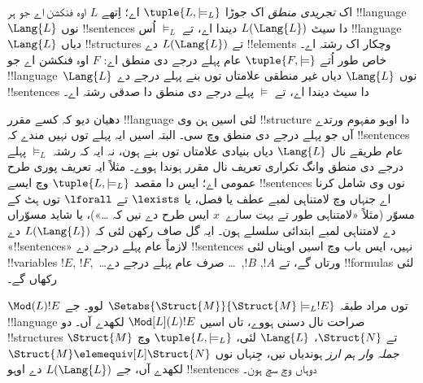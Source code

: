 \documentclass[../../../include/open-logic-section]{subfiles}
\begin{document}

\begin{defn}
اک \emph{تجریدی منطق} اک جوڑا $\tuple{L, \models_L}$ اے؛ اِتھے $L$
اوہ فنکشن اے جو ہر !!{language}~$\Lang{L}$ نوں
!!{sentence}s دا سیٹ $L(\Lang{L})$ دیندا اے، تے $\models_L$
اُس !!{language}~$\Lang{L}$ دیاں !!{structure}s تے
$L(\Lang{L})$ دے !!{element}s وچکار اک رشتہ اے۔ خاص طور اُتے
$\tuple{F, \models}$ عام پہلے درجے دی منطق اے: $F$ اوہ فنکشن اے
جو !!{language}~$\Lang{L}$ نوں $\Lang{L}$ دیاں غیر منطقی علامتاں توں بنے
پہلے درجے دے !!{sentence}s دا سیٹ دیندا اے، تے $\models$
پہلے درجے دی منطق دا صدقی رشتہ اے۔
\end{defn}

دھیان دیو کہ کسے مقرر !!{language} لئی اسیں ہن وی
!!{structure} دا اوہو مفہوم ورتدے آں جو پہلے درجے دی منطق وچ
سی۔ البتہ اسیں ایہ پہلے توں نہیں مندے کہ !!{sentence}s عام
طریقے نال $\Lang{L}$ دیاں بنیادی علامتاں توں بنے ہون، نہ ایہ
کہ رشتہ $\models_L$ پہلے درجے دی منطق وانگ تکراری تعریف نال
مقرر ہوندا ہووے۔ مثلاً ایہ تعریف پوری طرح عمومی اے؛ ایس دا
مقصد $\tuple{L,\models_L}$ وچ ایسے !!{sentence}s نوں وی شامل
کرنا اے جنہاں وچ لامتناہی لمبے
عطف یا فصل، یا $\lexists$ تے $\lforall$ توں ہٹ کے مسوّر
(مثلاً «لامتناہی طور تے بہت سارے~$x$ ایس طرح دے نیں کہ \dots»)،
یا شاید مسوّراں دے لامتناہی لمبے ابتدائی سلسلے ہون۔ ایہ گل
صاف رکھن لئی کہ $L(\Lang{L})$ دے «!!{sentence}s» لازماً عام
پہلے درجے دے !!{sentence}s نہیں، ایس باب وچ اسیں اوہناں لئی
!!{variable}s $!E$, $!F$,~\dots ورتاں گے، تے $!A$, $!B$,~\dots
صرف عام پہلے درجے دے !!{formula}s لئی رکھاں گے۔

\begin{defn}
$\Mod(L){!E}$ توں مراد طبقہ $\Setabs{\Struct{M}}{\Struct{M}
  \models_L !E}$ لوو۔ جے !!{language} صراحت نال دسنی ہووے،
تاں اسیں $\Mod[L](L){!E}$ لکھدے آں۔ دو
!!{structure}s $\Struct{M}$ تے $\Struct{N}$،
$\Lang{L}$ لئی،
$\tuple{L, \models_L}$ وچ \emph{جملہ وار ہم ارز} ہوندیاں نیں،
جِنہاں نوں $\Struct{M} \elemequiv[L] \Struct{N}$ لکھدے آں،
جے $L(\Lang{L})$ دے اوہو !!{sentence}s دوہاں وچ سچ ہون۔
\end{defn}
\end{document}
